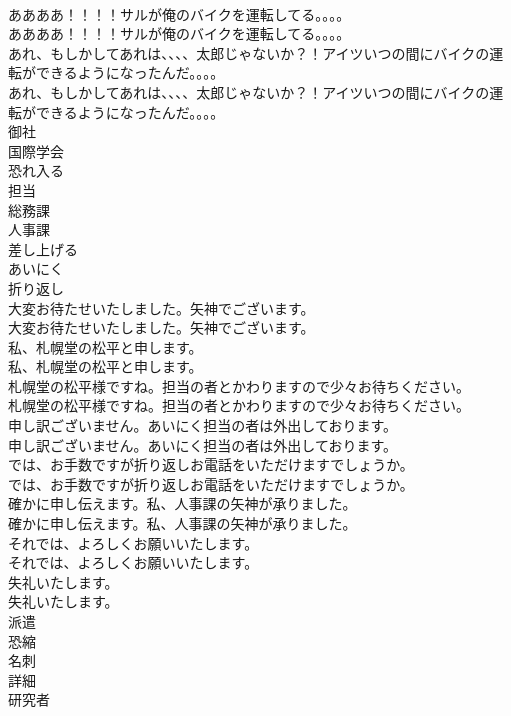 \documentclass[8pt]{extreport}
\begin{document}
\begin{CJK}{UTF8}{min}
\\	ああああ！！！！サルが俺のバイクを運転してる。。。。	
\\	ああああ！！！！サルが俺のバイクを運転してる。。。。 
\\	あれ、もしかしてあれは、、、、太郎じゃないか？！アイツいつの間にバイクの運転ができるようになったんだ。。。。	
\\	あれ、もしかしてあれは、、、、太郎じゃないか？！アイツいつの間にバイクの運転ができるようになったんだ。。。。 
\\	御社
\\	国際学会
\\	恐れ入る
\\	担当
\\	総務課
\\	人事課
\\	差し上げる
\\	あいにく
\\	折り返し
\\	大変お待たせいたしました。矢神でございます。	
\\	大変お待たせいたしました。矢神でございます。 
\\	私、札幌堂の松平と申します。	
\\	私、札幌堂の松平と申します。 
\\	札幌堂の松平様ですね。担当の者とかわりますので少々お待ちください。	
\\	札幌堂の松平様ですね。担当の者とかわりますので少々お待ちください。 
\\	申し訳ございません。あいにく担当の者は外出しております。	
\\	申し訳ございません。あいにく担当の者は外出しております。 
\\	では、お手数ですが折り返しお電話をいただけますでしょうか。	
\\	では、お手数ですが折り返しお電話をいただけますでしょうか。 
\\	確かに申し伝えます。私、人事課の矢神が承りました。	
\\	確かに申し伝えます。私、人事課の矢神が承りました。 
\\	それでは、よろしくお願いいたします。	
\\	それでは、よろしくお願いいたします。 
\\	失礼いたします。	
\\	失礼いたします。 
\\	派遣
\\	恐縮
\\	名刺
\\	詳細
\\	研究者

\end{CJK}
\end{document}
